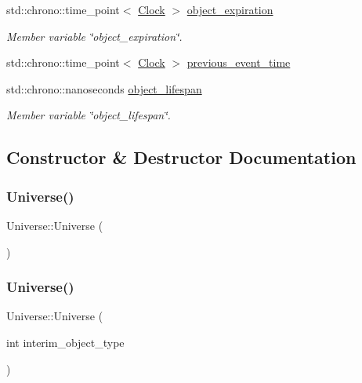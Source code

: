 \begin{DoxyCompactItemize}
std\+::chrono\+::time\+\_\+point$<$ \mbox{\hyperlink{universe_8h_a0ef8d951d1ca5ab3cfaf7ab4c7a6fd80}{Clock}} $>$ \mbox{\hyperlink{classUniverse_aacac76865f3600d5f308b83db9809184}{object\+\_\+expiration}}
\begin{DoxyCompactList}\small\item\em Member variable \char`\"{}object\+\_\+expiration\char`\"{}. \end{DoxyCompactList}\item 
std\+::chrono\+::time\+\_\+point$<$ \mbox{\hyperlink{universe_8h_a0ef8d951d1ca5ab3cfaf7ab4c7a6fd80}{Clock}} $>$ \mbox{\hyperlink{classUniverse_ad31a1d2865f16b1b8f4c597e116416e8}{previous\+\_\+event\+\_\+time}}
\item 
std\+::chrono\+::nanoseconds \mbox{\hyperlink{classUniverse_acb8bc2b083f0227a0427a5fbe6109286}{object\+\_\+lifespan}}
\begin{DoxyCompactList}\small\item\em Member variable \char`\"{}object\+\_\+lifespan\char`\"{}. \end{DoxyCompactList}\end{DoxyCompactItemize}


\subsection{Constructor \& Destructor Documentation}
\mbox{\label{classUniverse_a4d137a146dd3c2514dfb692dfbab6984}} 
\subsubsection{\texorpdfstring{Universe()}{Universe()}\hspace{0.1cm}{\footnotesize\ttfamily [1/3]}}
{\footnotesize\ttfamily Universe\+::\+Universe (\begin{DoxyParamCaption}{ }\end{DoxyParamCaption})\hspace{0.3cm}{\ttfamily [inline]}}

\mbox{\label{classUniverse_a1210ce56049f1fc67f53aeda223bb82b}} 
\subsubsection{\texorpdfstring{Universe()}{Universe()}\hspace{0.1cm}{\footnotesize\ttfamily [2/3]}}
{\footnotesize\ttfamily Universe\+::\+Universe (\begin{DoxyParamCaption}\item[{int}]{interim\+\_\+object\+\_\+type }\end{DoxyParamCaption})\hspace{0.3cm}{\ttfamily [inline]}}

